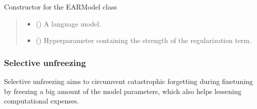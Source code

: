 \documentclass[letterpaper,10pt,english]{sphinxmanual}
\begin{document}
\begin{fulllineitems}
\begin{fulllineitems}

\pysigstartsignatures
\pysiglinewithargsret
{}
{\sphinxparamcomma {}}
{}
\pysigstopsignatures
\sphinxAtStartPar
Constructor for the EARModel class
\begin{quote}\begin{description}
\begin{itemize}
\item {} 
\sphinxAtStartPar
{} () \textendash{} A language model.

\item {} 
\sphinxAtStartPar
{} () \textendash{} Hyper\sphinxhyphen{}parameter containing the strength of the regularization term.

\end{itemize}

\end{description}\end{quote}

\end{fulllineitems}


\end{fulllineitems}



\subsubsection{Selective unfreezing}
\label{\detokenize{algorithms_inprocessors:selective-unfreezing}}\label{\detokenize{algorithms_inprocessors:selective}}
\sphinxAtStartPar
Selective unfreezing  aims to circumvent catastrophic forgetting during fine\sphinxhyphen{}tuning
by freezing a big amount of the model parameters, which also helps lessening computational expenses.
\end{document}
